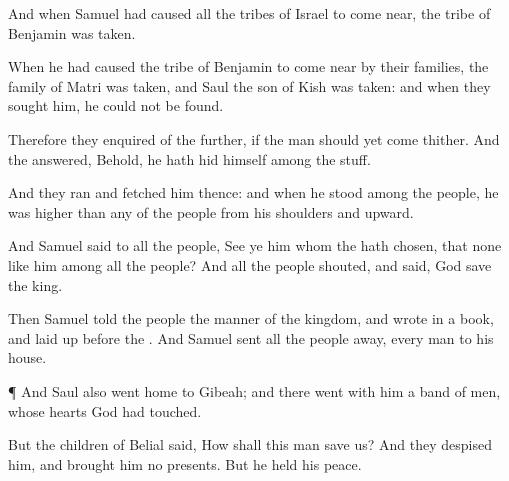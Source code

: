 {And when
Samuel had caused all the
tribes of
Israel to come
near, the
tribe of
Benjamin was
taken.

When he had caused the
tribe of
Benjamin to come
near by their
families, the
family of
Matri was
taken, and
Saul the
son of
Kish was
taken: and when they
sought him, he could not be
found.

Therefore they
enquired of the
{} further, if the
man should yet
come
thither. And the
{}
answered, Behold, he hath
hid himself among the
stuff.

And they
ran and
fetched him thence: and when he
stood
among the
people, he was
higher than any of the
people from his
shoulders and
upward.

And
Samuel
said to all the
people,
See ye him whom the
{} hath
chosen, that
{} none like him among all the
people? And all the
people
shouted, and
said, God
save the
king.

Then
Samuel
told the
people the
manner of the
kingdom, and
wrote
{} in a
book, and laid
{}
up
before the
{}. And
Samuel
sent all the
people
away, every
man to his
house.


\par }{\PP {}¶ And
Saul also
went
home to
Gibeah; and there
went with him a band of
men, whose
hearts
God had
touched.

But the
children of
Belial
said, How shall this man
save us? And they
despised him, and
brought him no
presents. But he held his
peace.




\par }
